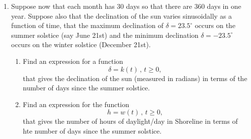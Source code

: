 \documentclass{ximera}
\begin{document}
\begin{question}
\begin{enumerate}
\item Suppose now that each month has 30 days so that there are 360 days in one year. Suppose also that the declination of the sun varies sinusoidally as a function of time, that the maximum declination of $\delta = 23.5^\circ$ occurs on the summer solstice (say June 21st) and the minimum declination $\delta = -23.5^\circ$ occurs on the winter solstice (December 21st). 

\begin{enumerate}
\item Find an expression for a function
\[
     \delta = k(t) \, , \, t\geq 0,
\]
that gives the declination of the sun (measured in radians) in terms of the number of days since the summer solstice. 

\item Find an expression for the function
\[
     h = w(t) \, , \, t\geq 0,
\]
that gives the number of hours of daylight/day in Shoreline in terms of hte number of days since the summer solstice.
\end{enumerate}
\end{enumerate}


\end{question}
\end{document}
